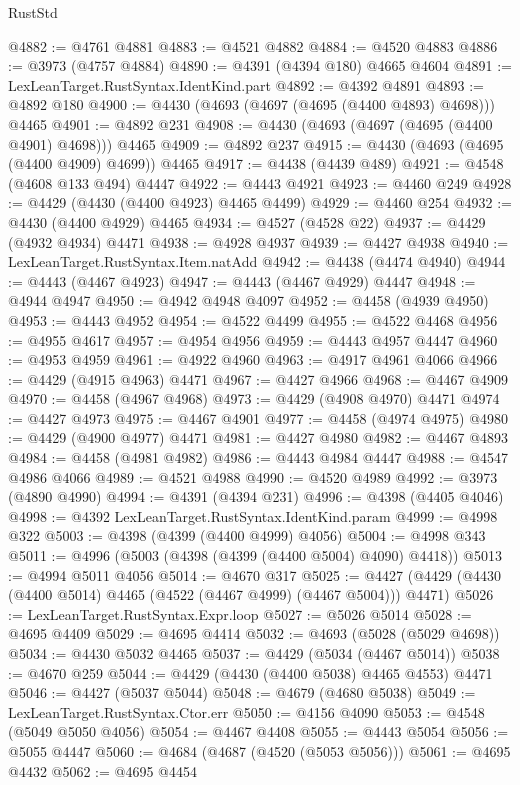 \begin{lexlean}{RustStd}
\begin{coremodule}
{\begin{coremodule}
{{{{{{{{{{{{{{{{{{{{{{{{{{{{{{{{{{{{{{{{{{{{{{{{{{{{{{{{{{{{{{{{{{{{@4882 := @4761 @4881
@4883 := @4521 @4882
@4884 := @4520 @4883
@4886 := @3973 (@4757 @4884)
@4890 := @4391 (@4394 @180) @4665 @4604
@4891 := LexLeanTarget.RustSyntax.IdentKind.part
@4892 := @4392 @4891
@4893 := @4892 @180
@4900 := @4430 (@4693 (@4697 (@4695 (@4400 @4893) @4698))) @4465
@4901 := @4892 @231
@4908 := @4430 (@4693 (@4697 (@4695 (@4400 @4901) @4698))) @4465
@4909 := @4892 @237
@4915 := @4430 (@4693 (@4695 (@4400 @4909) @4699)) @4465
@4917 := @4438 (@4439 @489)
@4921 := @4548 (@4608 @133 @494) @4447
@4922 := @4443 @4921
@4923 := @4460 @249
@4928 := @4429 (@4430 (@4400 @4923) @4465 @4499)
@4929 := @4460 @254
@4932 := @4430 (@4400 @4929) @4465
@4934 := @4527 (@4528 @22)
@4937 := @4429 (@4932 @4934) @4471
@4938 := @4928 @4937
@4939 := @4427 @4938
@4940 := LexLeanTarget.RustSyntax.Item.natAdd
@4942 := @4438 (@4474 @4940)
@4944 := @4443 (@4467 @4923)
@4947 := @4443 (@4467 @4929) @4447
@4948 := @4944 @4947
@4950 := @4942 @4948 @4097
@4952 := @4458 (@4939 @4950)
@4953 := @4443 @4952
@4954 := @4522 @4499
@4955 := @4522 @4468
@4956 := @4955 @4617
@4957 := @4954 @4956
@4959 := @4443 @4957 @4447
@4960 := @4953 @4959
@4961 := @4922 @4960
@4963 := @4917 @4961 @4066
@4966 := @4429 (@4915 @4963) @4471
@4967 := @4427 @4966
@4968 := @4467 @4909
@4970 := @4458 (@4967 @4968)
@4973 := @4429 (@4908 @4970) @4471
@4974 := @4427 @4973
@4975 := @4467 @4901
@4977 := @4458 (@4974 @4975)
@4980 := @4429 (@4900 @4977) @4471
@4981 := @4427 @4980
@4982 := @4467 @4893
@4984 := @4458 (@4981 @4982)
@4986 := @4443 @4984 @4447
@4988 := @4547 @4986 @4066
@4989 := @4521 @4988
@4990 := @4520 @4989
@4992 := @3973 (@4890 @4990)
@4994 := @4391 (@4394 @231)
@4996 := @4398 (@4405 @4046)
@4998 := @4392 LexLeanTarget.RustSyntax.IdentKind.param
@4999 := @4998 @322
@5003 := @4398 (@4399 (@4400 @4999) @4056)
@5004 := @4998 @343
@5011 := @4996 (@5003 (@4398 (@4399 (@4400 @5004) @4090) @4418))
@5013 := @4994 @5011 @4056
@5014 := @4670 @317
@5025 := @4427 (@4429 (@4430 (@4400 @5014) @4465 (@4522 (@4467 @4999) (@4467 @5004))) @4471)
@5026 := LexLeanTarget.RustSyntax.Expr.loop
@5027 := @5026 @5014
@5028 := @4695 @4409
@5029 := @4695 @4414
@5032 := @4693 (@5028 (@5029 @4698))
@5034 := @4430 @5032 @4465
@5037 := @4429 (@5034 (@4467 @5014))
@5038 := @4670 @259
@5044 := @4429 (@4430 (@4400 @5038) @4465 @4553) @4471
@5046 := @4427 (@5037 @5044)
@5048 := @4679 (@4680 @5038)
@5049 := LexLeanTarget.RustSyntax.Ctor.err
@5050 := @4156 @4090
@5053 := @4548 (@5049 @5050 @4056)
@5054 := @4467 @4408
@5055 := @4443 @5054
@5056 := @5055 @4447
@5060 := @4684 (@4687 (@4520 (@5053 @5056)))
@5061 := @4695 @4432
@5062 := @4695 @4454
}}}}}}}}}}}}}}}}}}}}}}}}}}}}}}}}}}}}}}}}}}}}}}}}}}}}}}}}}}}}}}}}}}}}
\end{coremodule}}
\end{coremodule}
\end{lexlean}
